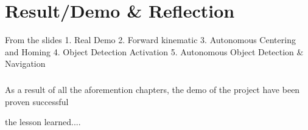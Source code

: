 \chapter{Result/Demo & Reflection}

From the slides 
1. Real Demo 
2. Forward kinematic
3. Autonomous Centering and Homing 
4. Object Detection Activation
5. Autonomous Object Detection & Navigation

\paragraph*{}
As a result of all the aforemention chapters, the demo of the project have been proven successful

the lesson learned....